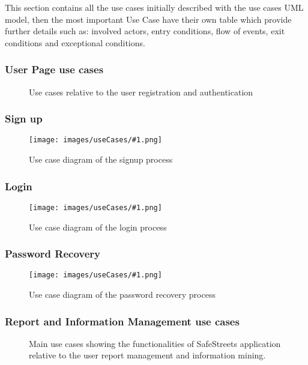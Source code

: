 \newcommand{\usecasefigure}[2]{
	\begin{figure}[htp]
		\centering
		\texttt{[image: images/useCases/\#1.png]}
		\caption{Use case diagram #2}
		\label{fig:use_cases_#1}
	\end{figure}
	\newpage
}

This section contains all the use cases initially described with the use cases UML model, then the most important Use Case have their own table which provide further details such as: involved actors, entry conditions, flow of events,  exit conditions and exceptional conditions.

\subsubsection{User Page use cases}
\begin{figure}[htp] 
\caption{Use cases relative to the user registration and authentication} 
\label{fig:userpage} 
\end{figure} 

\newpage
\subsubsection{Sign up}

\newpage
\usecasefigure{sign_up}{of the signup process}
\subsubsection{Login}

\newpage
\usecasefigure{login}{of the login process}
\subsubsection{Password Recovery}

\usecasefigure{password_recovery}{of the password recovery process}

\subsubsection{Report and Information Management use cases}
\begin{figure}[htp] 
	\caption{Main use cases showing the functionalities of SafeStreets application relative to the user report management and information mining.} 
	\label{fig:reportmanagement} 
\end{figure}

